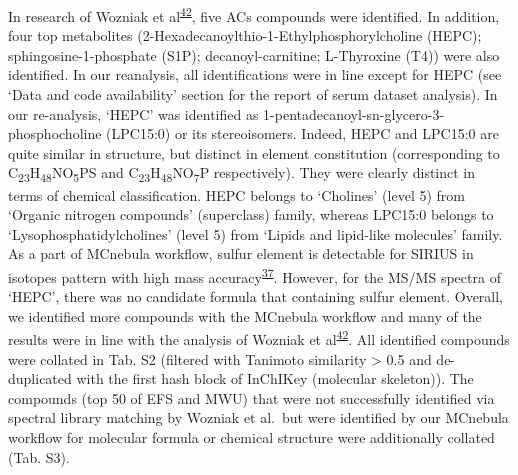 \documentclass[
]{article}
\begin{document}
In research of Wozniak et
al\textsuperscript{\protect\hyperlink{ref-2020s}{42}}, five ACs
compounds were identified. In addition, four top metabolites
(2-Hexadecanoylthio-1-Ethylphosphorylcholine (HEPC);
sphingosine-1-phosphate (S1P); decanoyl-carnitine; L-Thyroxine (T4))
were also identified. In our reanalysis, all identifications were in
line except for HEPC (see `Data and code availability' section for the
report of serum dataset analysis). In our re-analysis, `HEPC' was
identified as 1-pentadecanoyl-sn-glycero-3-phosphocholine (LPC15:0) or
its stereoisomers. Indeed, HEPC and LPC15:0 are quite similar in
structure, but distinct in element constitution (corresponding to
C\textsubscript{23}H\textsubscript{48}NO\textsubscript{5}PS and
C\textsubscript{23}H\textsubscript{48}NO\textsubscript{7}P
respectively). They were clearly distinct in terms of chemical
classification. HEPC belongs to `Cholines' (level 5) from `Organic
nitrogen compounds' (superclass) family, whereas LPC15:0 belongs to
`Lysophosphatidylcholines' (level 5) from `Lipids and lipid-like
molecules' family. As a part of MCnebula workflow, sulfur element is
detectable for SIRIUS in isotopes pattern with high mass
accuracy\textsuperscript{\protect\hyperlink{ref-bocker_sirius_2009}{37}}.
However, for the MS/MS spectra of `HEPC', there was no candidate formula
that containing sulfur element. Overall, we identified more compounds
with the MCnebula workflow and many of the results were in line with the
analysis of Wozniak et
al\textsuperscript{\protect\hyperlink{ref-2020s}{42}}. All identified
compounds were collated in Tab. S2 (filtered with Tanimoto similarity
\textgreater{} 0.5 and de-duplicated with the first hash block of
InChIKey (molecular skeleton)). The compounds (top 50 of EFS and MWU)
that were not successfully identified via spectral library matching by
Wozniak et al.~but were identified by our MCnebula workflow for
molecular formula or chemical structure were additionally collated (Tab.
S3).
\end{document}
